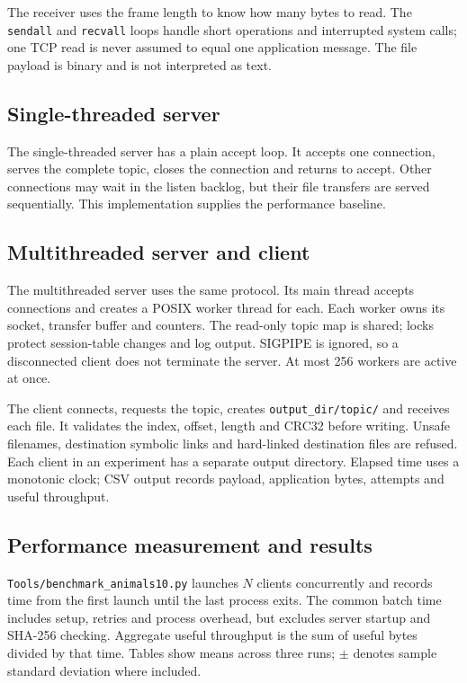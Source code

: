 \documentclass[11pt,a4paper]{article}
\newcommand{\code}[1]{\nolinkurl{#1}}
\newcommand{\nextpage}{\newpage}
\begin{document}
The receiver uses the frame length to know how many bytes to read. The \code{sendall} and \code{recvall} loops handle short operations and interrupted system calls; one TCP read is never assumed to equal one application message. The file payload is binary and is not interpreted as text.

\subsection{Single-threaded server}
The single-threaded server has a plain accept loop. It accepts one connection, serves the complete topic, closes the connection and returns to accept. Other connections may wait in the listen backlog, but their file transfers are served sequentially. This implementation supplies the performance baseline.

\nextpage
\subsection{Multithreaded server and client}
The multithreaded server uses the same protocol. Its main thread accepts connections and creates a POSIX worker thread for each. Each worker owns its socket, transfer buffer and counters. The read-only topic map is shared; locks protect session-table changes and log output. SIGPIPE is ignored, so a disconnected client does not terminate the server. At most 256 workers are active at once.

The client connects, requests the topic, creates \code{output_dir/topic/} and receives each file. It validates the index, offset, length and CRC32 before writing. Unsafe filenames, destination symbolic links and hard-linked destination files are refused. Each client in an experiment has a separate output directory. Elapsed time uses a monotonic clock; CSV output records payload, application bytes, attempts and useful throughput.

\subsection{Performance measurement and results}
\code{Tools/benchmark_animals10.py} launches $N$ clients concurrently and records time from the first launch until the last process exits. The common batch time includes setup, retries and process overhead, but excludes server startup and SHA-256 checking. Aggregate useful throughput is the sum of useful bytes divided by that time. Tables show means across three runs; $\pm$ denotes sample standard deviation where included.
\end{document}
